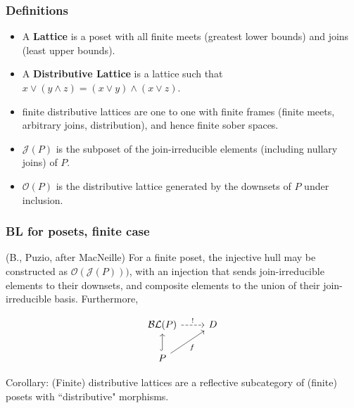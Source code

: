 \documentclass{beamer}
\newcommand{\Oc}{\mathcal{O}}
\newcommand{\Jc}{\mathcal{J}}
\newcommand{\BLc}{\mathcal{BL}}
\begin{document}
\begin{frame}
\frametitle{Definitions}
\begin{itemize}
\item A \textbf{Lattice} is a poset with all finite meets (greatest lower bounds) and joins (least upper bounds).

\item A \textbf{Distributive Lattice} is a lattice such that \(x \vee (y \wedge z) = (x \vee y) \wedge (x \vee z)\).

\item finite distributive lattices are one to one with finite frames (finite meets, arbitrary joins, distribution), and hence finite sober spaces.

\item \textbf{\(\Jc(P)\)} is the subposet of the join-irreducible elements (including nullary joins) of \(P\).

\item \textbf{\(\Oc(P)\)} is the distributive lattice generated by the downsets of \(P\) under inclusion.
\end{itemize}
\end{frame}

\begin{frame}[fragile]
\frametitle{BL for posets, finite case}

\begin{theorem}
(B., Puzio, after MacNeille) For a finite poset, the injective hull may be constructed as \(\Oc(\Jc(P)))\), with an injection that sends join-irreducible elements to their downsets, and composite elements to the union of their join-irreducible basis. Furthermore,

\begin{equation*}
\begin{tikzcd}
\BLc(P) \arrow[r, "!",dashed]            & D \\
P \arrow[u, hook] \arrow[ru, "f"'] &
\end{tikzcd}
\end{equation*}

\end{theorem}

Corollary: (Finite) distributive lattices are a reflective subcategory of (finite) posets with ``distributive" morphisms.
\end{frame}
\end{document}
